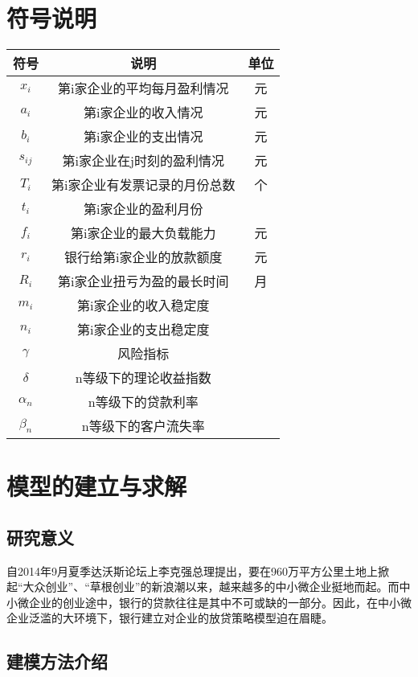\documentclass[dvipsnames,withoutpreface,bwprint]{cumcmthesis}
\begin{document}
\section{符号说明}
\begin{table}[H]
    \renewcommand\tabcolsep{2cm} %
    \begin{tabular}{@{\quad} ccc @{\qquad}@{\quad}}
        \toprule[1.5pt]
        符号 & 说明 & 单位\\
        \midrule[1.5pt]
        $x_i$ & 第i家企业的平均每月盈利情况 & 元\\
        $a_i$ & 第i家企业的收入情况 & 元\\
        $b_i$ & 第i家企业的支出情况 & 元\\
        $s_{ij}$ & 第i家企业在j时刻的盈利情况 & 元\\
        $T_i$ & 第i家企业有发票记录的月份总数 &个\\
        $t_i$ & 第i家企业的盈利月份 &{}\\
        $f_i$ & 第i家企业的最大负载能力 &元\\
        $r_i$ & 银行给第i家企业的放款额度 &元\\
        $R_i$ &第i家企业扭亏为盈的最长时间 &月\\
        $m_i$ &第i家企业的收入稳定度 &{}\\
        $n_i$ &第i家企业的支出稳定度 &{}\\
        $\gamma$ & 风险指标 &{}\\
        $\delta$ & n等级下的理论收益指数 &{}\\
        $\alpha_n$ & n等级下的贷款利率 &{}\\
        $\beta_n$ & n等级下的客户流失率 &{}\\
        \bottomrule[1.5pt]
    \end{tabular}
\end{table}
\section{模型的建立与求解}
\subsection{研究意义}
自2014年9月夏季达沃斯论坛上李克强总理提出，要在960万平方公里土地上掀起“大众创业”、“草根创业”的新浪潮以来，越来越多的中小微企业挺地而起。而中小微企业的创业途中，银行的贷款往往是其中不可或缺的一部分。因此，在中小微企业泛滥的大环境下，银行建立对企业的放贷策略模型迫在眉睫。
\subsection{建模方法介绍}
\end{document}
